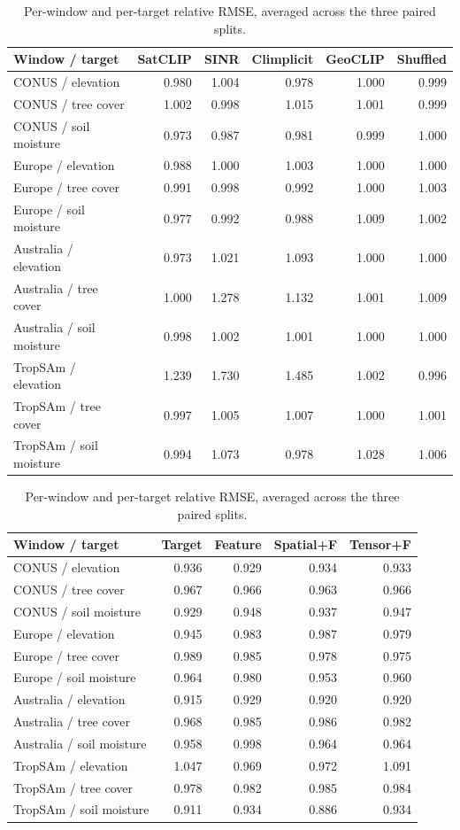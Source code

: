 \begin{table}[htbp]\centering\small
\caption{Per-window and per-target relative RMSE, averaged across the three paired splits.}
\label{tab:paired5}
\begin{tabular}{@{}lrrrrr@{}}
\toprule
Window / target&SatCLIP&SINR&Climplicit&GeoCLIP&Shuffled\\\midrule
CONUS / elevation&0.980&1.004&0.978&1.000&0.999\\
CONUS / tree cover&1.002&0.998&1.015&1.001&0.999\\
CONUS / soil moisture&0.973&0.987&0.981&0.999&1.000\\
Europe / elevation&0.988&1.000&1.003&1.000&1.000\\
Europe / tree cover&0.991&0.998&0.992&1.000&1.003\\
Europe / soil moisture&0.977&0.992&0.988&1.009&1.002\\
Australia / elevation&0.973&1.021&1.093&1.000&1.000\\
Australia / tree cover&1.000&1.278&1.132&1.001&1.009\\
Australia / soil moisture&0.998&1.002&1.001&1.000&1.000\\
TropSAm / elevation&1.239&1.730&1.485&1.002&0.996\\
TropSAm / tree cover&0.997&1.005&1.007&1.000&1.001\\
TropSAm / soil moisture&0.994&1.073&0.978&1.028&1.006\\
\bottomrule\end{tabular}

\end{table}
\begin{table}[htbp]\centering\small
\caption{Per-window and per-target relative RMSE, averaged across the three paired splits.}
\label{tab:paired4}
\begin{tabular}{@{}lrrrr@{}}
\toprule
Window / target&Target&Feature&Spatial+F&Tensor+F\\\midrule
CONUS / elevation&0.936&0.929&0.934&0.933\\
CONUS / tree cover&0.967&0.966&0.963&0.966\\
CONUS / soil moisture&0.929&0.948&0.937&0.947\\
Europe / elevation&0.945&0.983&0.987&0.979\\
Europe / tree cover&0.989&0.985&0.978&0.975\\
Europe / soil moisture&0.964&0.980&0.953&0.960\\
Australia / elevation&0.915&0.929&0.920&0.920\\
Australia / tree cover&0.968&0.985&0.986&0.982\\
Australia / soil moisture&0.958&0.998&0.964&0.964\\
TropSAm / elevation&1.047&0.969&0.972&1.091\\
TropSAm / tree cover&0.978&0.982&0.985&0.984\\
TropSAm / soil moisture&0.911&0.934&0.886&0.934\\
\bottomrule\end{tabular}

\end{table}
